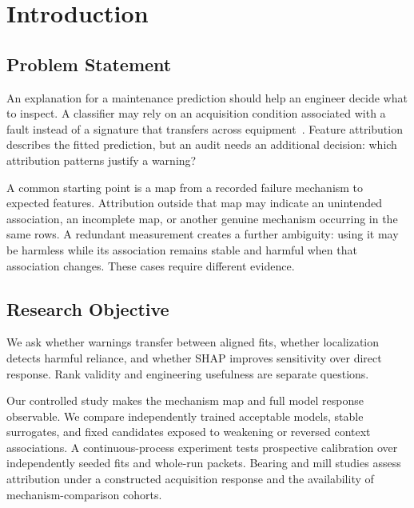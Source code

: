 \documentclass[conference]{IEEEtran}
\begin{document}
\section{Introduction}
\label{sec:introduction}
\subsection{Problem Statement}
An explanation for a maintenance prediction should help an engineer decide what to inspect. A classifier may rely on an acquisition condition associated with a fault instead of a signature that transfers across equipment~\cite{geirhos2020shortcut,lapuschkin2019unmasking}. Feature attribution describes the fitted prediction, but an audit needs an additional decision: which attribution patterns justify a warning?

A common starting point is a map from a recorded failure mechanism to expected features. Attribution outside that map may indicate an unintended association, an incomplete map, or another genuine mechanism occurring in the same rows. A redundant measurement creates a further ambiguity: using it may be harmless while its association remains stable and harmful when that association changes. These cases require different evidence.

\subsection{Research Objective}
We ask whether warnings transfer between aligned fits, whether localization detects harmful reliance, and whether SHAP improves sensitivity over direct response. Rank validity and engineering usefulness are separate questions.

Our controlled study makes the mechanism map and full model response observable. We compare independently trained acceptable models, stable surrogates, and fixed candidates exposed to weakening or reversed context associations. A continuous-process experiment tests prospective calibration over independently seeded fits and whole-run packets. Bearing and mill studies assess attribution under a constructed acquisition response and the availability of mechanism-comparison cohorts.
\end{document}
